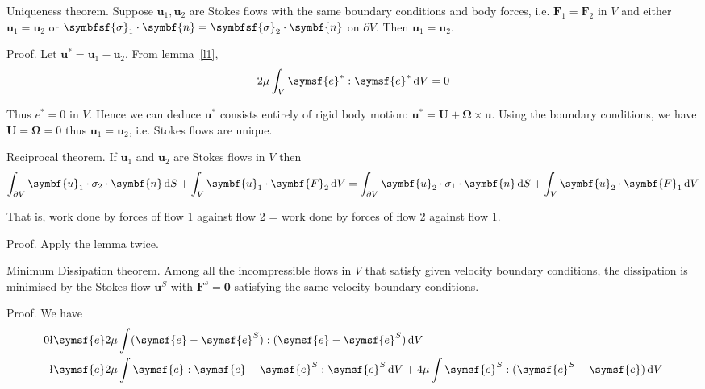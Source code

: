 \documentclass{jknotes}
\begin{document}
\begin{theorem}
	Uniqueness theorem. Suppose $\symbf{u}_1, \symbf{u}_2$ are Stokes flows with the
	same boundary conditions and body forces, i.e. $\symbf{F}_1 = \symbf{F}_2$ in
	$V$ and either $\symbf{u}_1 = \symbf{u}_2$ or $\symbfsf{\sigma}_1 \cdot \symbf{n} = \symbfsf{\sigma}_2
	\cdot \symbf{n}$ on $\partial V$. Then $\symbf{u}_1 = \symbf{u}_2$.
\end{theorem}

Proof. Let $\symbf{u}^* = \symbf{u}_1 - \symbf{u}_2$. From lemma~\ref{l1}, 
\begin{equation}
	2\mu \int_V \symsf{e}^* : \symsf{e}^* \, \diffd V = 0
\end{equation}

Thus $e^* = 0$ in $V$. Hence we can deduce $\symbf{u}^*$ consists entirely of
rigid body motion: $\symbf{u}^* = \symbf{U} + \symbf{\Omega} \times \symbf{u}$. Using the
boundary conditions, we have $\symbf{U} = \symbf{\Omega} = 0$ thus $\symbf{u}_1 =
\symbf{u}_2$, i.e. Stokes flows are unique.

\begin{theorem}
	Reciprocal theorem. If $\symbf{u}_1$ and $\symbf{u}_2$ are Stokes flows in $V$
	then
	\begin{equation}
		\int_{\partial V} \symbf{u}_1 \cdot \sigma_2 \cdot \symbf{n} \, \diffd S +
		\int_V \symbf{u}_1 \cdot \symbf{F}_2 \, \diffd V = 
		\int_{\partial V} \symbf{u}_2 \cdot \sigma_1 \cdot \symbf{n} \, \diffd S +
		\int_V \symbf{u}_2 \cdot \symbf{F}_1 \, \diffd V
	\end{equation}

	That is, work done by forces of flow 1 against flow 2 = work done by
	forces of flow 2 against flow 1.
\end{theorem}

Proof. Apply the lemma twice.

\begin{theorem}
	Minimum Dissipation theorem. Among all the incompressible flows in $V$
	that satisfy given velocity boundary conditions, the dissipation is
	minimised by the Stokes flow $\symbf{u}^S$ with $\symbf{F}^s = \symbf{0}$
	satisfying the same velocity boundary conditions.
\end{theorem}

Proof. We have
\begin{equation}
	\begin{aligned}
		0 &\l\symsf{e} 2\mu \int (\symsf{e} - \symsf{e}^S):(\symsf{e}-\symsf{e}^S) \, \diffd V \\
		  &\l\symsf{e} 2\mu \int \symsf{e}:\symsf{e} - \symsf{e}^S:\symsf{e}^S \, \diffd V + 4\mu \int \symsf{e}^S : (\symsf{e}^S
		-\symsf{e})\,\diffd V
	\end{aligned}
\end{equation}
\end{document}

